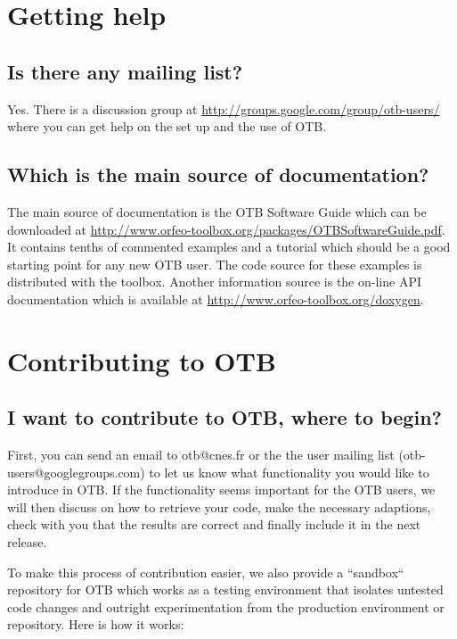 \section{Getting help}
\subsection{Is there any mailing list?}
Yes. There is a discussion group at
\url{http://groups.google.com/group/otb-users/} where you can get help
on the set up and the use of OTB.

\subsection{Which is the main source of documentation?}
The main source of documentation is the OTB Software Guide which can
be downloaded at
\url{http://www.orfeo-toolbox.org/packages/OTBSoftwareGuide.pdf}. It
contains tenths of commented examples and a tutorial which should be a good starting
point for any new OTB user. The code source for these examples is
distributed with the toolbox. Another information source is the
on-line API documentation which is available at \url{http://www.orfeo-toolbox.org/doxygen}.

\section{Contributing to OTB}\label{sec:contributing}

\subsection{I want to contribute to OTB, where to begin?}

First, you can send an email to otb@cnes.fr or the the user mailing list (otb-users@googlegroups.com)
to let us know what functionality
you would like to introduce in OTB. If the functionality seems important for the
OTB users, we will then discuss on how to retrieve your code,
make the necessary adaptions, check with you that the results are correct and finally
include it in the next release.

To make this process of contribution easier, we also provide a
``sandbox`` repository for OTB which works as a testing environment that
isolates untested code changes and outright experimentation from the
production environment or repository. Here is how it works:

